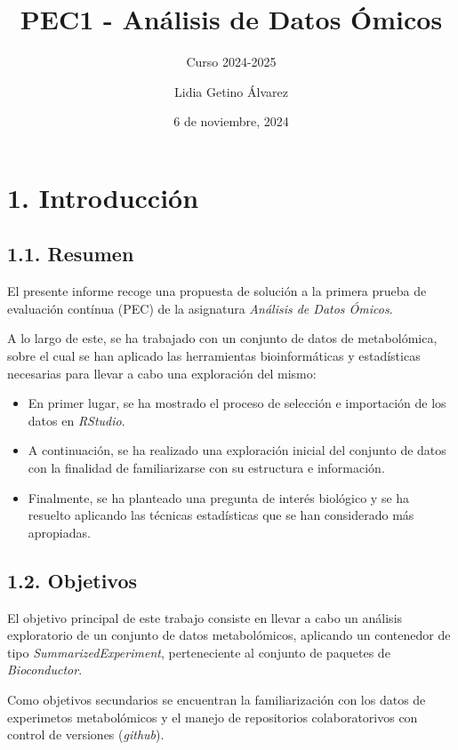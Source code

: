 \documentclass[
]{article}
\title{PEC1 - Análisis de Datos Ómicos}
\subtitle{Curso 2024-2025}
\author{Lidia Getino Álvarez}
\date{6 de noviembre, 2024}
\begin{document}
\maketitle

{
\setcounter{tocdepth}{3}
\tableofcontents
}
\section{1. Introducción}\label{introducciuxf3n}

\subsection{1.1. Resumen}\label{resumen}

El presente informe recoge una propuesta de solución a la primera prueba
de evaluación contínua (PEC) de la asignatura \emph{Análisis de Datos
Ómicos}.

A lo largo de este, se ha trabajado con un conjunto de datos de
metabolómica, sobre el cual se han aplicado las herramientas
bioinformáticas y estadísticas necesarias para llevar a cabo una
exploración del mismo:

\begin{itemize}
\item
  En primer lugar, se ha mostrado el proceso de selección e importación
  de los datos en \emph{RStudio}.
\item
  A continuación, se ha realizado una exploración inicial del conjunto
  de datos con la finalidad de familiarizarse con su estructura e
  información.
\item
  Finalmente, se ha planteado una pregunta de interés biológico y se ha
  resuelto aplicando las técnicas estadísticas que se han considerado
  más apropiadas.
\end{itemize}

\subsection{1.2. Objetivos}\label{objetivos}

El objetivo principal de este trabajo consiste en llevar a cabo un
análisis exploratorio de un conjunto de datos metabolómicos, aplicando
un contenedor de tipo \emph{SummarizedExperiment}, perteneciente al
conjunto de paquetes de \emph{Bioconductor}.

Como objetivos secundarios se encuentran la familiarización con los
datos de experimetos metabolómicos y el manejo de repositorios
colaboratorivos con control de versiones (\emph{github}).
\end{document}
